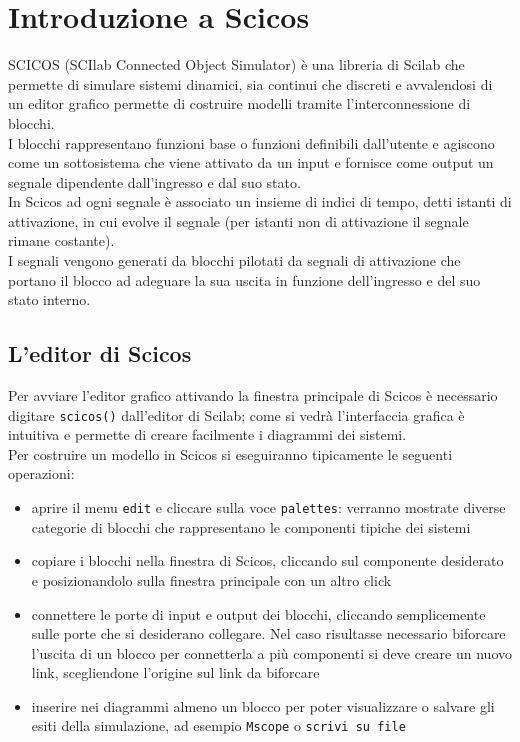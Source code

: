 \chapter{Introduzione a Scicos}
SCICOS (SCIlab Connected Object Simulator) \`e una libreria di Scilab che permette di simulare sistemi dinamici, sia continui che discreti e avvalendosi di un editor grafico permette di costruire modelli tramite l'interconnessione di blocchi.\\
I blocchi rappresentano funzioni base o funzioni definibili dall'utente e agiscono come un sottosistema che viene attivato da un input e fornisce come output un segnale dipendente dall'ingresso e dal suo stato.\\
In Scicos ad ogni segnale \`e associato un insieme di indici di tempo, detti istanti di attivazione, in cui evolve il segnale (per istanti non di attivazione il segnale rimane costante).\\
I segnali vengono generati da blocchi pilotati da segnali di attivazione che portano il blocco ad adeguare la sua uscita in funzione dell'ingresso e del suo stato interno.

\section{L'editor di Scicos}
Per avviare l'editor grafico attivando la finestra principale di Scicos \`e necessario digitare \verb+scicos()+ dall'editor di Scilab; come si vedr\`a l'interfaccia grafica \`e intuitiva e permette di creare facilmente i diagrammi dei sistemi.\\
Per costruire un modello in Scicos si eseguiranno tipicamente le seguenti operazioni:
\begin{itemize}
\item aprire il menu \verb+edit+ e cliccare sulla voce \verb+palettes+: verranno mostrate diverse categorie di blocchi che rappresentano le componenti tipiche dei sistemi
\item copiare i blocchi nella finestra di Scicos, cliccando sul componente desiderato e posizionandolo sulla finestra principale con un altro click
\item connettere le porte di input e output dei blocchi, cliccando semplicemente sulle porte che si desiderano collegare. Nel caso risultasse necessario biforcare l'uscita di un blocco per connetterla a pi\`u componenti si deve creare un nuovo link, scegliendone l'origine sul link da biforcare
\item inserire nei diagrammi almeno un blocco per poter visualizzare o salvare gli esiti della simulazione, ad esempio \verb+Mscope+ o \verb+scrivi su file+
\end{itemize}

